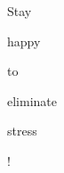\documentclass[varwidth]{standalone}
\begin{document}
\begin{CJK*}{UTF8}{gbsn}
{\setlength{\fboxsep}{0pt}\colorbox{white!0}{\parbox{0.9\textwidth}{
\colorbox{red!-0.0}{\strut Stay} \colorbox{blue!100.0}{\strut happy} \colorbox{red!-0.0}{\strut to} \colorbox{red!-0.0}{\strut eliminate} \colorbox{red!73.702}{\strut stress} \colorbox{red!-0.0}{\strut !} 
}}}
\end{CJK*}
\end{document}
